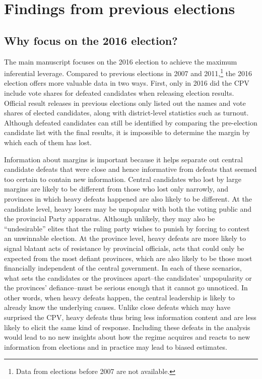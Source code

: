 \documentclass[12pt]{article}
\newcommand\fnote[1]{\footnote{\baselineskip=2\normalbaselineskip#1}}
\newcommand{\1}{\mathbbm{1}}
\begin{document}
\clearpage
\section{Findings from previous elections}
\label{app:previous_elections}

\subsection{Why focus on the 2016 election?}

The main manuscript focuses on the 2016 election to achieve the maximum inferential leverage. Compared to previous elections in 2007 and 2011,\fnote{Data from elections before 2007 are not available.} the 2016 election offers more valuable data in two ways. First, only in 2016 did the CPV include vote shares for defeated candidates when releasing election results. Official result releases in previous elections only listed out the names and vote shares of elected candidates, along with district-level statistics such as turnout. Although defeated candidates can still be identified by comparing the pre-election candidate list with the final results, it is impossible to determine the margin by which each of them has lost. 

Information about margins is important because it helps separate out central candidate defeats that were close and hence informative from defeats that seemed too certain to contain new information. Central candidates who lost by large margins are likely to be different from those who lost only narrowly, and provinces in which heavy defeats happened are also likely to be different. At the candidate level, heavy losers may be unpopular with both the voting public and the provincial Party apparatus. Although unlikely, they may also be ``undesirable'' elites that the ruling party wishes to punish by forcing to contest an unwinnable election. At the province level, heavy defeats are more likely to signal blatant acts of resistance by provincial officials, acts that could only be expected from the most defiant provinces, which are also likely to be those most financially independent of the central government. In each of these scenarios, what sets the candidates or the provinces apart--the candidates' unpopularity or the provinces' defiance--must be serious enough that it cannot go unnoticed. In other words, when heavy defeats happen, the central leadership is likely to already know the underlying causes. Unlike close defeats which may have surprised the CPV, heavy defeats thus bring less information content and are less likely to elicit the same kind of response. Including these defeats in the analysis would lead to no new insights about how the regime acquires and reacts to new information from elections and in practice may lead to biased estimates.
\end{document}

